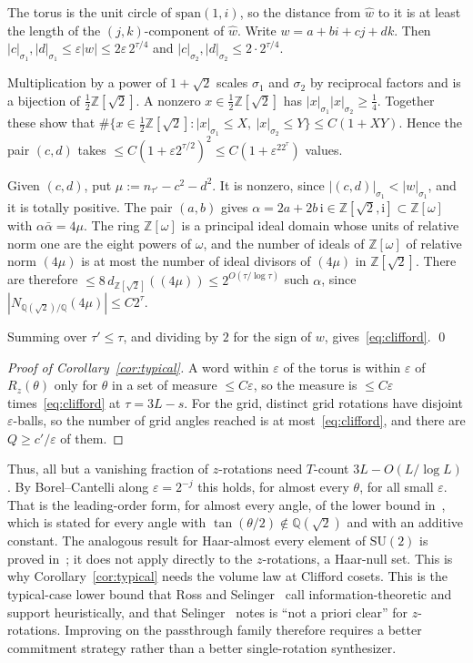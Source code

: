 \documentclass[aps,prx,twocolumn,superscriptaddress,nofootinbib,longbibliography]{revtex4-2}
\theoremstyle{plain}
\theoremstyle{definition}
\theoremstyle{remark}
\newcommand{\Z}{\mathbb{Z}}
\newcommand{\Q}{\mathbb{Q}}
\newcommand{\SU}{\mathrm{SU}(2)}
\begin{document}
The torus is the unit circle of $\mathrm{span}(1,i)$, so the distance from $\hat w$ to it is at least the length of the $(j,k)$-component of $\hat w$. Write $w=a+bi+cj+dk$. Then $|c|_{\sigma_1},|d|_{\sigma_1}\le\varepsilon|w|\le2\varepsilon\,2^{\tau/4}$ and $|c|_{\sigma_2},|d|_{\sigma_2}\le2\cdot2^{\tau/4}$.

Multiplication by a power of $1+\sqrt2$ scales $\sigma_1$ and $\sigma_2$ by reciprocal factors and is a bijection of $\tfrac12\Z[\sqrt2]$. A nonzero $x\in\tfrac12\Z[\sqrt2]$ has $|x|_{\sigma_1}|x|_{\sigma_2}\ge\tfrac14$. Together these show that $\#\{x\in\tfrac12\Z[\sqrt2]:|x|_{\sigma_1}\le X,\ |x|_{\sigma_2}\le Y\}\le C(1+XY)$. Hence the pair $(c,d)$ takes $\le C(1+\varepsilon2^{\tau/2})^2\le C(1+\varepsilon^22^\tau)$ values.

Given $(c,d)$, put $\mu:=n_{\tau'}-c^2-d^2$. It is nonzero, since $|(c,d)|_{\sigma_1}<|w|_{\sigma_1}$, and it is totally positive. The pair $(a,b)$ gives $\alpha=2a+2b\,\mathrm i\in\Z[\sqrt2,\mathrm i]\subset\Z[\omega]$ with $\alpha\bar\alpha=4\mu$. The ring $\Z[\omega]$ is a principal ideal domain whose units of relative norm one are the eight powers of $\omega$, and the number of ideals of $\Z[\omega]$ of relative norm $(4\mu)$ is at most the number of ideal divisors of $(4\mu)$ in $\Z[\sqrt2]$. There are therefore $\le8\,d_{\Z[\sqrt2]}((4\mu))\le2^{O(\tau/\log\tau)}$ such $\alpha$, since $|N_{\Q(\sqrt2)/\Q}(4\mu)|\le C2^{\tau}$.

Summing over $\tau'\le\tau$, and dividing by $2$ for the sign of $w$, gives~\eqref{eq:clifford}. \qed

\begin{proof}[Proof of Corollary~\ref{cor:typical}]
A word within $\varepsilon$ of the torus is within $\varepsilon$ of $R_z(\theta)$ only for $\theta$ in a set of measure $\le C\varepsilon$, so the measure is $\le C\varepsilon$ times~\eqref{eq:clifford} at $\tau=3L-s$. For the grid, distinct grid rotations have disjoint $\varepsilon$-balls, so the number of grid angles reached is at most~\eqref{eq:clifford}, and there are $Q\ge c'/\varepsilon$ of them.
\end{proof}
Thus, all but a vanishing fraction of $z$-rotations need $T$-count $3L-O(L/\log L)$. By Borel--Cantelli along $\varepsilon=2^{-j}$ this holds, for almost every $\theta$, for all small $\varepsilon$. That is the leading-order form, for almost every angle, of the lower bound in~\cite[Sec.~8.3, Conj.~1]{RossSelinger}, which is stated for every angle with $\tan(\theta/2)\notin\Q(\sqrt2)$ and with an additive constant. The analogous result for Haar-almost every element of $\SU$ is proved in~\cite{SMA}; it does not apply directly to the $z$-rotations, a Haar-null set. This is why Corollary~\ref{cor:typical} needs the volume law at Clifford cosets. This is the typical-case lower bound that Ross and Selinger~\cite{RossSelinger} call information-theoretic and support heuristically, and that Selinger~\cite[\S9]{Selinger15} notes is ``not a priori clear'' for $z$-rotations. Improving on the passthrough family therefore requires a better commitment strategy rather than a better single-rotation synthesizer.
\end{document}
